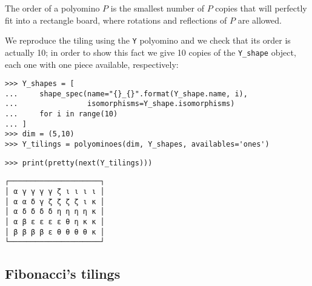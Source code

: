 \begin{definition}
The order of a polyomino $P$ is the smallest number of $P$ copies that will
perfectly fit into a rectangle board, where rotations and reflections of $P$
are allowed.
\end{definition}

We reproduce the tiling using the \verb|Y| polyomino and we check that its order is
actually 10; in order to show this fact we give 10 copies of the \verb|Y_shape| object,
each one with one piece available, respectively:
\begin{verbatim}
>>> Y_shapes = [
...     shape_spec(name="{}_{}".format(Y_shape.name, i),
...                isomorphisms=Y_shape.isomorphisms)
...     for i in range(10)
... ]
>>> dim = (5,10)
>>> Y_tilings = polyominoes(dim, Y_shapes, availables='ones')
\end{verbatim}

\begin{margintable}
\texttt{>>> print(pretty(next(Y_tilings)))}
{\footnotesize
\begin{verbatim}
┌─────────────────────┐
│ α γ γ γ γ ζ ι ι ι ι │
│ α α δ γ ζ ζ ζ ζ ι κ │
│ α δ δ δ δ η η η η κ │
│ α β ε ε ε ε θ η κ κ │
│ β β β β ε θ θ θ θ κ │
└─────────────────────┘
\end{verbatim}
}
\end{margintable}

\subsection{Fibonacci's tilings}

\inputminted[fontsize=\small,stripnl=false, firstline=514,lastline=530]{python}{backtracking/polyominoes.py}

